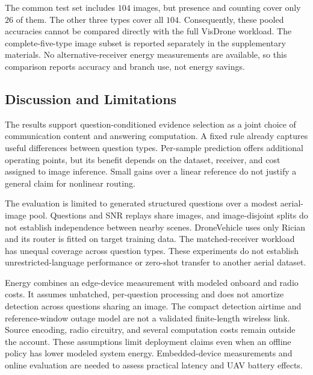 The common test set includes $104$ images, but presence and counting
cover only $26$ of them. The other three types cover all $104$.
Consequently, these pooled accuracies cannot be compared directly
with the full VisDrone workload. The complete-five-type image
subset is reported separately in the supplementary materials.
No alternative-receiver energy measurements are available, so this
comparison reports accuracy and branch use, not energy savings.

\subsection{Discussion and Limitations}\label{sec:limits}
The results support question-conditioned evidence selection as a
joint choice of communication content and answering computation.
A fixed rule already captures useful differences between question
types. Per-sample prediction offers additional operating points,
but its benefit depends on the dataset, receiver, and cost assigned
to image inference. Small gains over a linear reference do not
justify a general claim for nonlinear routing.

The evaluation is limited to generated structured questions over
a modest aerial-image pool. Questions and SNR replays share images,
and image-disjoint splits do not establish independence between
nearby scenes. DroneVehicle uses only Rician and its router is
fitted on target training data. The matched-receiver workload has
unequal coverage across question types. These experiments do not
establish unrestricted-language performance or zero-shot transfer
to another aerial dataset.

Energy combines an edge-device measurement with modeled onboard
and radio costs. It assumes unbatched, per-question processing and
does not amortize detection across questions sharing an image.
The compact detection airtime and reference-window outage model
are not a validated finite-length wireless link. Source encoding,
radio circuitry, and several computation costs remain outside the
account. These assumptions limit deployment claims even when an
offline policy has lower modeled system energy. Embedded-device
measurements and online evaluation are needed to assess practical
latency and UAV battery effects.
